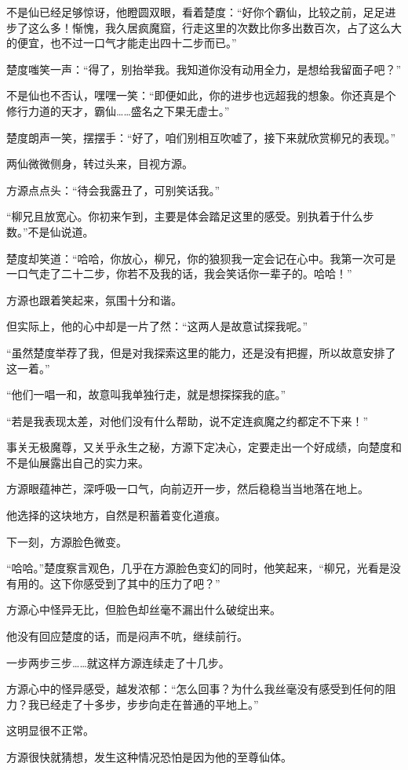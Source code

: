 \begin{this_body}
不是仙已经足够惊讶，他瞪圆双眼，看着楚度：“好你个霸仙，比较之前，足足进步了这么多！惭愧，我久居疯魔窟，行走这里的次数比你多出数百次，占了这么大的便宜，也不过一口气才能走出四十二步而已。”

楚度嗤笑一声：“得了，别抬举我。我知道你没有动用全力，是想给我留面子吧？”

不是仙也不否认，嘿嘿一笑：“即便如此，你的进步也远超我的想象。你还真是个修行力道的天才，霸仙……盛名之下果无虚士。”

楚度朗声一笑，摆摆手：“好了，咱们别相互吹嘘了，接下来就欣赏柳兄的表现。”

两仙微微侧身，转过头来，目视方源。

方源点点头：“待会我露丑了，可别笑话我。”

“柳兄且放宽心。你初来乍到，主要是体会踏足这里的感受。别执着于什么步数。”不是仙说道。

楚度却笑道：“哈哈，你放心，柳兄，你的狼狈我一定会记在心中。我第一次可是一口气走了二十二步，你若不及我的话，我会笑话你一辈子的。哈哈！”

方源也跟着笑起来，氛围十分和谐。

但实际上，他的心中却是一片了然：“这两人是故意试探我呢。”

“虽然楚度举荐了我，但是对我探索这里的能力，还是没有把握，所以故意安排了这一着。”

“他们一唱一和，故意叫我单独行走，就是想探探我的底。”

“若是我表现太差，对他们没有什么帮助，说不定连疯魔之约都定不下来！”

事关无极魔尊，又关乎永生之秘，方源下定决心，定要走出一个好成绩，向楚度和不是仙展露出自己的实力来。

方源眼蕴神芒，深呼吸一口气，向前迈开一步，然后稳稳当当地落在地上。

他选择的这块地方，自然是积蓄着变化道痕。

下一刻，方源脸色微变。

“哈哈。”楚度察言观色，几乎在方源脸色变幻的同时，他笑起来，“柳兄，光看是没有用的。这下你感受到了其中的压力了吧？”

方源心中怪异无比，但脸色却丝毫不漏出什么破绽出来。

他没有回应楚度的话，而是闷声不吭，继续前行。

一步两步三步……就这样方源连续走了十几步。

方源心中的怪异感受，越发浓郁：“怎么回事？为什么我丝毫没有感受到任何的阻力？我已经走了十多步，步步向走在普通的平地上。”

这明显很不正常。

方源很快就猜想，发生这种情况恐怕是因为他的至尊仙体。


\end{this_body}
